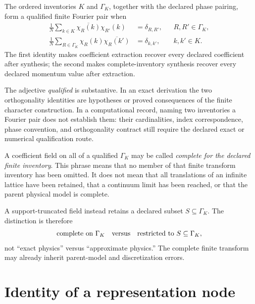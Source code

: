 \begin{definition}
The ordered inventories $K$ and $\Gamma_K$, together with the declared phase
pairing, form a qualified finite Fourier pair when
\begin{align}
  \frac{1}{N}\sum_{k\in K}
    \overline{\chi_R(k)}\chi_{R'}(k)
  &=\delta_{R,R'},
  &&R,R'\in\Gamma_K,
  \label{eq:representation-carrier-translation-orthogonality}\\
  \frac{1}{N}\sum_{R\in\Gamma_K}
    \chi_R(k)\overline{\chi_R(k')}
  &=\delta_{k,k'},
  &&k,k'\in K.
  \label{eq:representation-carrier-momentum-orthogonality}
\end{align}
The first identity makes coefficient extraction recover every declared
coefficient after synthesis; the second makes complete-inventory synthesis
recover every declared momentum value after extraction.
\end{definition}

The adjective \emph{qualified} is substantive. In an exact derivation the two
orthogonality identities are hypotheses or proved consequences of the finite
character construction. In a computational record, naming two inventories a
Fourier pair does not establish them: their cardinalities, index correspondence,
phase convention, and orthogonality contract still require the declared exact
or numerical qualification route.

A coefficient field on all of a qualified $\Gamma_K$ may be called
\emph{complete for the declared finite inventory}. This phrase means that no
member of that finite transform inventory has been omitted. It does not mean
that all translations of an infinite lattice have been retained, that a
continuum limit has been reached, or that the parent physical model is complete.

A support-truncated field instead retains a declared subset
$S\subseteq\Gamma_K$. The distinction is therefore
\begin{equation}
  \text{complete on }\Gamma_K
  \quad\hbox{versus}\quad
  \text{restricted to }S\subseteq\Gamma_K,
  \label{eq:representation-carrier-complete-versus-truncated}
\end{equation}
not ``exact physics'' versus ``approximate physics.'' The complete finite
transform may already inherit parent-model and discretization errors.

\section{Identity of a representation node}

